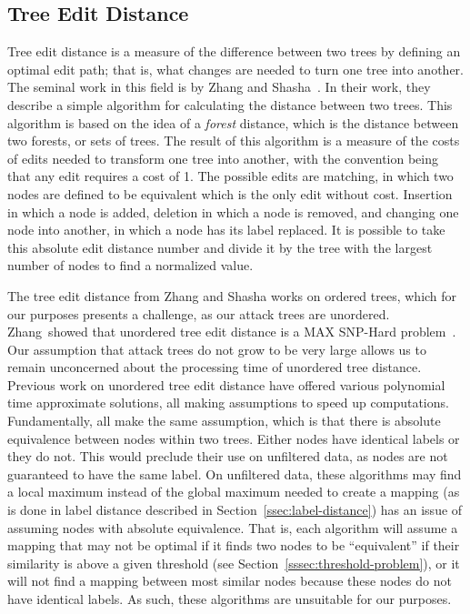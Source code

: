 \subsection{Tree Edit Distance}

Tree edit distance is a measure of the difference between two trees by defining an optimal edit path; that is, what changes are needed to turn one tree into another. The seminal work in this field is by Zhang and Shasha~\cite{Zhang_Shasha_1989}. In their work, they describe a simple algorithm for calculating the distance between two trees. This algorithm is based on the idea of a \textit{forest} distance, which is the distance between two forests, or sets of trees. The result of this algorithm is a measure of the costs of edits needed to transform one tree into another, with the convention being that any edit requires a cost of 1. The possible edits are matching, in which two nodes are defined to be equivalent which is the only edit without cost. Insertion in which a node is added, deletion in which a node is removed, and changing one node into another, in which a node has its label replaced. It is possible to take this absolute edit distance number and divide it by the tree with the largest number of nodes to find a normalized value.

The tree edit distance from Zhang and Shasha works on ordered trees, which for our purposes presents a challenge, as our attack trees are unordered. Zhang~\etal showed that unordered tree edit distance is a MAX SNP-Hard problem~\cite{zhang_max_1994}. Our assumption that attack trees do not grow to be very large allows us to remain unconcerned about the processing time of unordered tree distance. Previous work on unordered tree edit distance have offered various polynomial time approximate solutions, all making assumptions to speed up computations. Fundamentally, all make the same assumption, which is that there is absolute equivalence between nodes within two trees. Either nodes have identical labels or they do not. This would preclude their use on unfiltered data, as nodes are not guaranteed to have the same label. On unfiltered data, these algorithms may find a local maximum instead of the global maximum needed to create a mapping (as is done in label distance described in Section~\ref{ssec:label-distance}) has an issue of assuming nodes with absolute equivalence. That is, each algorithm will assume a mapping that may not be optimal if it finds two nodes to be ``equivalent'' if their similarity is above a given threshold (see Section~\ref{sssec:threshold-problem}), or it will not find a mapping between most similar nodes because these nodes do not have identical labels. As such, these algorithms are unsuitable for our purposes.


